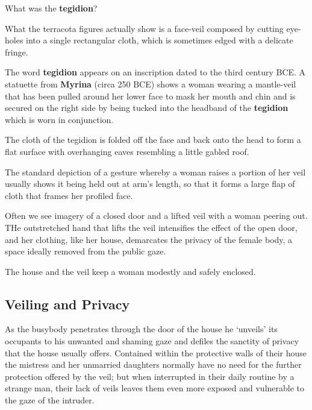 \begin{qst}
    What was the \textbf{tegidion}?
\end{qst}
What the terracota figures actually show is a face-veil composed by cutting eye-holes into a single rectangular cloth, which is sometimes edged with a delicate fringe. 

The word \textbf{tegidion} appears on an inscription dated to the third century BCE. A statuette from \textbf{Myrina} (circa 250 BCE) shows a woman wearing a mantle-veil that has been pulled around her lower face to mask her mouth and chin and is secured on the right side by being tucked into the headband of the \textbf{tegidion} which is worn in conjunction.

The cloth of the tegidion is folded off the face and back onto the head to form a flat surface with overhanging eaves resembling a little gabled roof. 

\begin{nte}
    The standard depiction of a gesture whereby a woman raises a portion of her veil usually shows it being held out at arm's length, so that it forms a large flap of cloth that frames her profiled face.
\end{nte}

Often we see imagery of a closed door and a lifted veil with a woman peering out. THe outstretched hand that lifts the veil intensifies the effect of the open door, and her clothing, like her house, demarcates the privacy of the female body, a space ideally removed from the public gaze. 

\begin{rmk}
    The house and the veil keep a woman modestly and safely enclosed.
\end{rmk}


\subsection{Veiling and Privacy}

As the busybody penetrates through the door of the house he `unveils' its occupants to his unwanted and shaming gaze and defiles the sanctity of privacy that the house usually offers. Contained within the protective walls of their house the mistress and her unmarried daughters normally have no need for the further protection offered by the veil; but when interrupted in their daily routine by a strange man, their lack of veils leaves them even more exposed and vulnerable to the gaze of the intruder.

